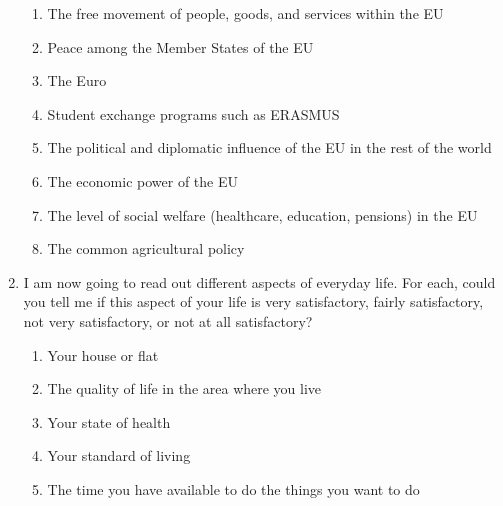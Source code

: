 \documentclass[12pt, a4]{article}
\begin{document}
\begin{enumerate}
		\begin{enumerate}
			\item The free movement of people, goods, and services within the EU
			\item Peace among the Member States of the EU
			\item The Euro
			\item Student exchange programs such as ERASMUS
			\item The political and diplomatic influence of the EU in the rest of the world
			\item The economic power of the EU
			\item The level of social welfare (healthcare, education, pensions) in the EU
			\item The common agricultural policy
		\end{enumerate}
	\item I am now going to read out different aspects of everyday life. For each, could you tell me if this aspect of your life is very satisfactory, fairly satisfactory, not very satisfactory, or not at all satisfactory?
		\begin{enumerate}
			\item Your house or flat
			\item The quality of life in the area where you live
			\item Your state of health
			\item Your standard of living
			\item The time you have available to do the things you want to do
		\end{enumerate}
\end{enumerate}
\end{document}
